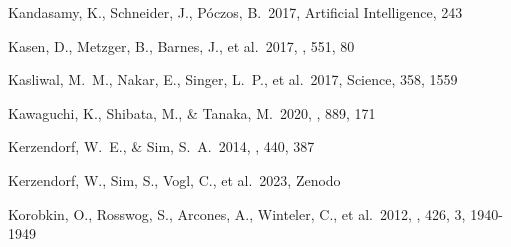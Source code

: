 \documentclass[twocolumn,twocolappendix]{aastex63}
\begin{document}
\begin{thebibliography}{}


 Kandasamy, K., Schneider, J., P{\'o}czos, B.\ 2017, Artificial Intelligence, 243








 Kasen, D., Metzger, B., Barnes, J., et al.\ 2017, \nat, 551, 80




 Kasliwal, M.~M., Nakar, E., Singer, L.~P., et al.\ 2017, Science, 358, 1559








 Kawaguchi, K., Shibata, M., \& Tanaka, M.\ 2020, \apj, 889, 171


 Kerzendorf, W.~E., \& Sim, S.~A.\ 2014, \mnras, 440, 387


 Kerzendorf, W., Sim, S., Vogl, C., et al.\ 2023, Zenodo





 Korobkin, O., Rosswog, S., Arcones, A., Winteler, C., et al.\ 2012, \mnras, 426, 3, 1940-1949



\end{thebibliography}
\end{document}
